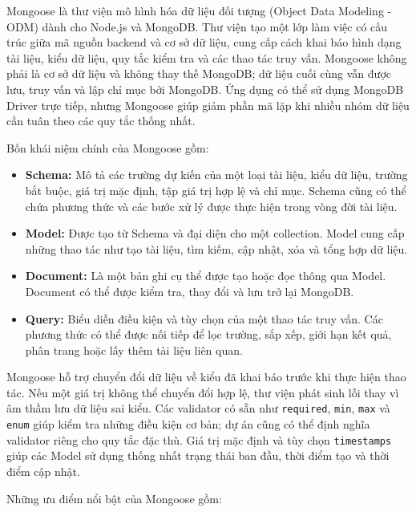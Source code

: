 Mongoose là thư viện mô hình hóa dữ liệu đối tượng (Object Data Modeling - ODM) dành cho Node.js và MongoDB. Thư viện tạo một lớp làm việc có cấu trúc giữa mã nguồn backend và cơ sở dữ liệu, cung cấp cách khai báo hình dạng tài liệu, kiểu dữ liệu, quy tắc kiểm tra và các thao tác truy vấn. Mongoose không phải là cơ sở dữ liệu và không thay thế MongoDB; dữ liệu cuối cùng vẫn được lưu, truy vấn và lập chỉ mục bởi MongoDB. Ứng dụng có thể sử dụng MongoDB Driver trực tiếp, nhưng Mongoose giúp giảm phần mã lặp khi nhiều nhóm dữ liệu cần tuân theo các quy tắc thống nhất.

Bốn khái niệm chính của Mongoose gồm:

\begin{itemize}
    \item \textbf{Schema:} Mô tả các trường dự kiến của một loại tài liệu, kiểu dữ liệu, trường bắt buộc, giá trị mặc định, tập giá trị hợp lệ và chỉ mục. Schema cũng có thể chứa phương thức và các bước xử lý được thực hiện trong vòng đời tài liệu.

    \item \textbf{Model:} Được tạo từ Schema và đại diện cho một collection. Model cung cấp những thao tác như tạo tài liệu, tìm kiếm, cập nhật, xóa và tổng hợp dữ liệu.

    \item \textbf{Document:} Là một bản ghi cụ thể được tạo hoặc đọc thông qua Model. Document có thể được kiểm tra, thay đổi và lưu trở lại MongoDB.

    \item \textbf{Query:} Biểu diễn điều kiện và tùy chọn của một thao tác truy vấn. Các phương thức có thể được nối tiếp để lọc trường, sắp xếp, giới hạn kết quả, phân trang hoặc lấy thêm tài liệu liên quan.
\end{itemize}

Mongoose hỗ trợ chuyển đổi dữ liệu về kiểu đã khai báo trước khi thực hiện thao tác. Nếu một giá trị không thể chuyển đổi hợp lệ, thư viện phát sinh lỗi thay vì âm thầm lưu dữ liệu sai kiểu. Các validator có sẵn như \texttt{required}, \texttt{min}, \texttt{max} và \texttt{enum} giúp kiểm tra những điều kiện cơ bản; dự án cũng có thể định nghĩa validator riêng cho quy tắc đặc thù. Giá trị mặc định và tùy chọn \texttt{timestamps} giúp các Model sử dụng thống nhất trạng thái ban đầu, thời điểm tạo và thời điểm cập nhật.

Những ưu điểm nổi bật của Mongoose gồm:

